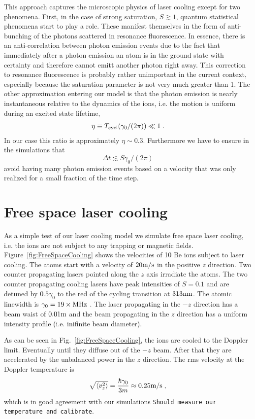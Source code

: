 \documentclass[
  aps,
  reprint,
  twoside,
  showpacs,
  amsmath,
  amssymb,
  floatfix
]{revtex4-1}
\newcommand{\domcomment}[1]{{\tt #1}}
\begin{document}
This approach captures the microscopic physics of laser cooling except
for two phenomena.  First, in the case of strong saturation,
$S\gtrsim 1$, quantum statistical phenomena start to play a role.
These manifest themselves in the form of anti-bunching of the photons
scattered in resonance fluorescence.  In essence, there is an
anti-correlation between photon emission events due to the fact that
immediately after a photon emission an atom is in the ground state with
certainty and therefore cannot emitt another photon right away.  This
correction to resonance fluorescence is probably rather unimportant in
the current context, especially because the saturation parameter is not
very much greater than 1.  The other approximation entering our model is
that the photon emission is nearly instantaneous relative to the
dynamics of the ions, i.e. the motion is uniform during an excited
state lifetime,
\begin{equation}
\eta \equiv T_{\rm cycl}(\gamma_0/(2\pi)) \ll 1\;.
\end{equation}
In our case this ratio is approximately $\eta \sim 0.3$.  Furthermore we
have to ensure in the simulations that
\begin{equation}
\Delta t \lesssim S\gamma_0/(2\pi)
\end{equation}
avoid having many photon emission events based on a velocity that was
only realized for a small fraction of the time step.


\section{Free space laser cooling}

As a simple test of our laser cooling model we simulate free space laser
cooling, i.e. the ions are not subject to any trapping or magnetic
fields.  Figure~\ref{fig:FreeSpaceCooling} shows the velocities of 10 Be
ions subject to laser cooling.  The atoms start with a velocity of
$20{\rm m}/{\rm s}$ in the positive $z$ direction.  Two counter
propagating lasers pointed along the $z$ axis irradiate the atoms. The
two counter propagating cooling lasers have peak intensities of $S=0.1$
and are detuned by $0.5\gamma_0$ to the red of the cycling transition at
$313{\rm nm}$.  The atomic linewidth is $\gamma_0=19\times {\rm MHz}$ .
The laser propagating in the $-z$ direction has a beam waist of
$0.01{\rm m}$ and the beam propagating in the $z$ direction has a
uniform intensity profile (i.e. inifinite beam diameter).

As can be seen in Fig.~\ref{fig:FreeSpaceCooling}, the ions are cooled
to the Doppler limit.  Eventually until they diffuse out of the $-z$
beam.  After that they are accelerated by the unbalanced power in the
$z$ direction.  The rms velocity at the Doppler temperature is
\begin{equation}
\sqrt{\langle v_z^2\rangle} = \frac{\hbar \gamma_0}{3 m} \approx
0.25{\rm m}/{\rm s}\;,
\end{equation}
which is in good agreement with our simulations
\domcomment{Should measure our temperature and calibrate}.
\end{document}
